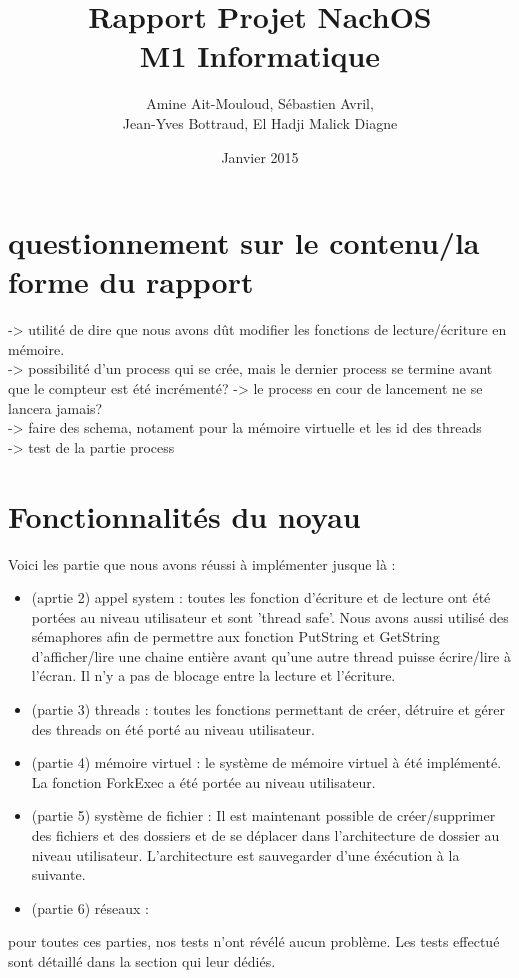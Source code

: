 \documentclass{article}
\begin{document}
\title {Rapport Projet NachOS \\ M1 Informatique}
\author{Amine Ait-Mouloud, Sébastien Avril,\\ Jean-Yves Bottraud, El Hadji Malick Diagne}
\date{Janvier 2015}
\maketitle

\section{questionnement sur le contenu/la forme du rapport}
	-> utilité de dire que nous avons dût modifier les fonctions de lecture/écriture en mémoire.
	\\ -> possibilité d'un process qui se crée, mais le dernier process se termine avant que le compteur est été incrémenté? -> le process en cour de lancement ne se lancera jamais?
	\\ -> faire des schema, notament pour la mémoire virtuelle et les id des threads
	\\ -> test de la partie process

\tableofcontents{}
\newpage
\section{Fonctionnalités du noyau}
	Voici les partie que nous avons réussi à implémenter jusque là :
	\begin{itemize}
		\item (aprtie 2) appel system : toutes les fonction d'écriture et de lecture ont été portées au niveau utilisateur et sont 'thread safe'. Nous avons aussi utilisé des sémaphores afin de permettre aux fonction PutString et GetString d'afficher/lire une chaine entière avant qu'une autre thread puisse écrire/lire à l'écran. Il n'y a pas de blocage entre la lecture et l'écriture.
		\item (partie 3) threads : toutes les fonctions permettant de créer, détruire et gérer des threads on été porté au niveau utilisateur.
		\item (partie 4) mémoire virtuel : le système de mémoire virtuel à été implémenté. La fonction ForkExec a été portée au niveau utilisateur.
		\item (partie 5) système de fichier : Il est maintenant possible de créer/supprimer des fichiers et des dossiers et de se déplacer dans l'architecture de dossier au niveau utilisateur. L'architecture est sauvegarder d'une éxécution à la suivante.
		\item (partie 6) réseaux : 
	\end{itemize}
	pour toutes ces parties, nos tests n'ont révélé aucun problème. Les tests effectué sont détaillé dans la section qui leur dédiés.
\end{document}
